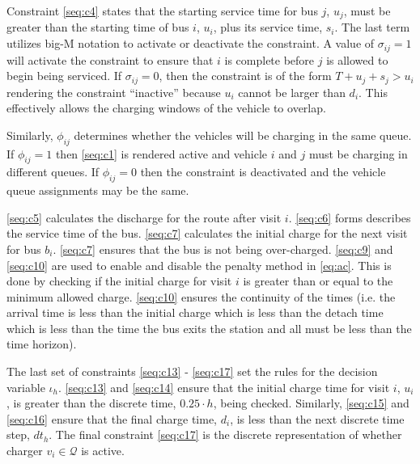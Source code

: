 \documentclass[11pt,a4paper,final]{article}
\newcommand{\Qset}{\mathcal{Q}}             %
\begin{document}
Constraint \ref{seq:c4} states that the starting service time for bus \(j\), \(u_j\), must be greater than the starting time
of bus \(i\), \(u_i\), plus its service time, \(s_i\). The last term utilizes big-M notation to activate or deactivate the
constraint. A value of \(\sigma_{ij} = 1\) will activate the constraint to ensure that \(i\) is complete before \(j\) is
allowed to begin being serviced. If \(\sigma_{ij} = 0\), then the constraint is of the form \(T + u_j + s_j > u_i\)
rendering the constraint ``inactive'' because \(u_i\) cannot be larger than \(d_i\). This effectively allows the charging
windows of the vehicle to overlap.

Similarly, \(\phi_{ij}\) determines whether the vehicles will be charging in the same queue. If \(\phi_{ij} = 1\) then
\eqref{seq:c1} is rendered active and vehicle \(i\) and \(j\) must be charging in different queues. If \(\phi_{ij} = 0\) then
the constraint is deactivated and the vehicle queue assignments may be the same.

\ref{seq:c5} calculates the discharge for the route after visit \(i\). \ref{seq:c6} forms describes the service time of
the bus. \ref{seq:c7} calculates the initial charge for the next visit for bus \(b_i\). \ref{seq:c7} ensures that the bus
is not being over-charged. \ref{seq:c9} and \ref{seq:c10} are used to enable and disable the penalty method in \ref{eq:ac}.
This is done by checking if the initial charge for visit \(i\) is greater than or equal to the minimum allowed charge.
\ref{seq:c10} ensures the continuity of the times (i.e. the arrival time is less than the initial charge which is less
than the detach time which is less than the time the bus exits the station and all must be less than the time horizon).

The last set of constraints \ref{seq:c13} - \ref{seq:c17} set the rules for the decision variable \(\iota_h\).
\ref{seq:c13} and \ref{seq:c14} ensure that the initial charge time for visit \(i\), \(u_i\), is greater than the discrete
time, \(0.25 \cdot h\), being checked. Similarly, \ref{seq:c15} and \ref{seq:c16} ensure that the final charge time, \(d_i\),
is less than the next discrete time step, \(dt_h\). The final constraint \ref{seq:c17} is the discrete representation of
whether charger \(v_i \in \Qset\) is active.
\end{document}
